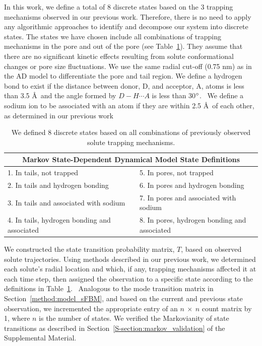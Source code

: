 \documentclass[aps,pre,preprint,groupedaddress,longbibliography]{revtex4-2}
\begin{document}
  In this work, we define a total of 8 discrete states based on the 3 trapping
  mechanisms observed in our previous work. Therefore, there is no need to 
  apply any algorithmic approaches to identify and decompose our system into 
  discrete states. The states we have chosen include all combinations of trapping
  mechanisms in the pore and out of the pore (see Table~\ref{table:states}). They
  assume that there are no significant kinetic effects resulting from solute 
  conformational changes or pore size fluctuations. We use the same radial cut-off
  (0.75 nm) as in the AD model to differentiate the pore and tail region.  We define 
  a hydrogen bond to exist if the distance between donor, D, and acceptor, A, 
  atoms is less than 3.5 \AA~and the angle formed by $D-H \cdots A$ is less than
  30$\degree$.~\cite{luzar_effect_1996} We define a sodium ion to be associated 
  with an atom if they are within 2.5 \AA~of each other, as determined in our 
  previous work~\cite{coscia_chemically_2019}
  
  \begin{table}[!htb]
	  \centering
	  \begin{tabular}{ll}
	  \multicolumn{2}{c}{Markov State-Dependent Dynamical Model State Definitions} \\
	  \hline
	  1. In tails, not trapped                      & 5. In pores, not trapped                     \\
	  2. In tails and hydrogen bonding              & 6. In pores and hydrogen bonding             \\
	  3. In tails and associated with sodium        & 7. In pores and associated with sodium       \\
	  4. In tails, hydrogen bonding and associated  ~~~~& 8. In pores, hydrogen bonding and associated \\
	  \end{tabular}
	  \caption{We defined 8 discrete states based on all combinations of previously observed solute
	  trapping mechanisms.}\label{table:states}  
  \end{table}
  
  We constructed the state transition probability matrix, $T$, based on observed 
  solute trajectories. Using methods described in our previous work, we determined 
  each solute's radial location and which, if any, trapping mechanisms affected 
  it at each time step, then assigned the observation to a specific state according
  to the definitions in Table~\ref{table:states}.~\cite{coscia_chemically_2019}
  Analogous to the mode transition matrix in Section~\ref{method:model_sFBM}, and 
  based on the current and previous state observation, we incremented the appropriate
  entry of an $n~\times~n$ count matrix by 1, where $n$ is the number of states. We
  verified the Markovianity of state transitions as described in 
  Section~\ref{S-section:markov_validation} of the Supplemental Material.
  
\end{document}
